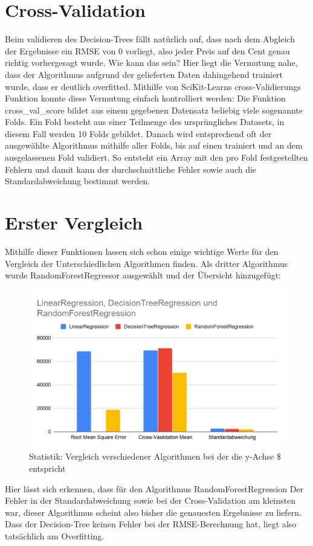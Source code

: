 \section{Cross-Validation}
\label{crossValidation}
Beim validieren des Decision-Trees fällt natürlich auf, dass nach dem Abgleich der Ergebnisse ein \ac{RMSE} von 0 vorliegt, also jeder Preis auf den Cent genau richtig vorhergesagt wurde. Wie kann das sein? 
Hier liegt die Vermutung nahe, dass der Algorithmus aufgrund der gelieferten Daten dahingehend trainiert wurde, dass er deutlich overfitted.
Mithilfe von SciKit-Learns cross-Validierungs Funktion konnte diese Vermutung einfach kontrolliert werden: Die Funktion cross\_val\_score bildet aus einem gegebenen Datensatz beliebig viele sogenannte Folds. Ein Fold besteht aus einer Teilmenge des ursprüngliches Datasets, in diesem Fall werden 10 Folds gebildet. Danach wird entsprechend oft der ausgewählte Algorithmus mithilfe aller Folds, bis auf einen trainiert und an dem ausgelassenen Fold validiert. So entsteht ein Array mit den pro Fold festgestellten Fehlern und damit kann der durchschnittliche Fehler sowie auch die Standardabweichung bestimmt werden.


\section{Erster Vergleich}
\label{ErsterVergleich}
Mithilfe dieser Funktionen lassen sich schon einige wichtige Werte für den Vergleich der Unterschiedlichen Algorithmen finden.
Als dritter Algorithmus wurde RandomForestRegressor ausgewählt und der Übersicht hinzugefügt:
\newline
\begin{figure}
	\includegraphics[width=1.0\textwidth]{../Bilder/imageLikeEmbed.png}
	\caption{Statistik: Vergleich verschiedener Algorithmen bei der die y-Achse \$ entspricht}
\end{figure}
Hier lässt sich erkennen, dass für den Algorithmus RandomForestRegression Der Fehler in der Standardabweichung sowie bei der Cross-Validation am kleinsten war, dieser Algorithmus scheint also bisher die genauesten Ergebnisse zu liefern. Dass der Decision-Tree keinen Fehler bei der \ac{RMSE}-Berechnung hat, liegt also tatsächlich am Overfitting.


